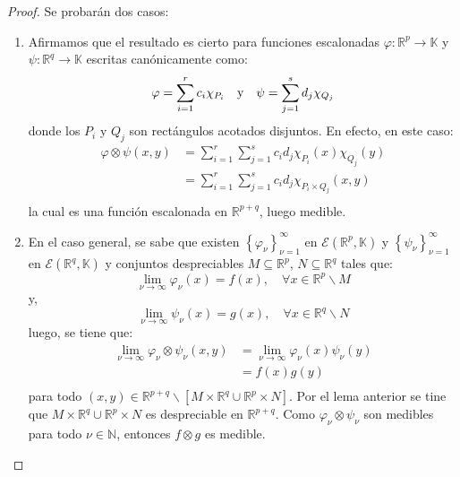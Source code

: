 \documentclass[12pt]{report}
\theoremstyle{largebreak}
\newcommand\cf[3]{\ensuremath{#1:#2\rightarrow#3}}
\begin{document}
    \begin{proof}
        Se probarán dos casos:
        \begin{enumerate}
            \item Afirmamos que el resultado es cierto para funciones escalonadas $\cf{\varphi}{\mathbb{R}^p}{\mathbb{K}}$ y $\cf{\psi}{\mathbb{R}^q}{\mathbb{K}}$ escritas canónicamente como:
            \begin{equation*}
                \varphi=\sum_{ i=1}^{r}c_i\chi_{ P_i}\quad\textup{y}\quad\psi=\sum_{ j=1}^{s}d_j\chi_{ Q_j}
            \end{equation*}
            donde los $P_i$ y $Q_j$ son rectángulos acotados disjuntos. En efecto, en este caso:
            \begin{equation*}
                \begin{split}
                    \varphi\otimes \psi(x,y)&=\sum_{ i=1}^{r}\sum_{ j=1}^{s}c_id_j\chi_{ P_i}(x)\chi_{ Q_j}(y)\\
                    &=\sum_{ i=1}^{r}\sum_{ j=1}^{s}c_id_j\chi_{ P_i\times Q_j}(x,y)\\
                \end{split}
            \end{equation*}
            la cual es una función escalonada en $\mathbb{R}^{ p+q}$, luego medible.
            \item En el caso general, se sabe que existen $\left\{ \varphi_\nu\right\}_{ \nu=1}^\infty$ en $\mathcal{E}(\mathbb{R}^p,\mathbb{K})$ y $\left\{\psi_\nu \right\}_{ \nu=1}^\infty$ en $\mathcal{E}(\mathbb{R}^q,\mathbb{K})$ y conjuntos despreciables $M\subseteq \mathbb{R}^p$, $N\subseteq \mathbb{R}^q$ tales que:
            \begin{equation*}
                \lim_{ \nu\rightarrow\infty}\varphi_\nu(x)=f(x),\quad\forall x\in \mathbb{R}^p\backslash M
            \end{equation*}
            y,
            \begin{equation*}
                \lim_{ \nu\rightarrow\infty}\psi_\nu(x)=g(x),\quad\forall x\in \mathbb{R}^q\backslash N
            \end{equation*}
            luego, se tiene que:
            \begin{equation*}
                \begin{split}
                    \lim_{ \nu\rightarrow\infty}\varphi_\nu\otimes \psi_\nu(x,y)&=\lim_{ \nu\rightarrow\infty}\varphi_\nu(x)\psi_\nu(y)\\
                    &=f(x)g(y)\\
                \end{split}
            \end{equation*}
            para todo $(x,y)\in \mathbb{R}^{ p+q}\backslash\left[M\times\mathbb{R}^q\cup\mathbb{R}^p\times N \right]$. Por el lema anterior se tine que $M\times\mathbb{R}^q\cup\mathbb{R}^p\times N$ es despreciable en $\mathbb{R}^{ p+q}$. Como $\varphi_\nu\otimes \psi_\nu$ son medibles para todo $\nu\in\mathbb{N}$, entonces $f\otimes g$ es medible.
        \end{enumerate}
    \end{proof}
\end{document}
